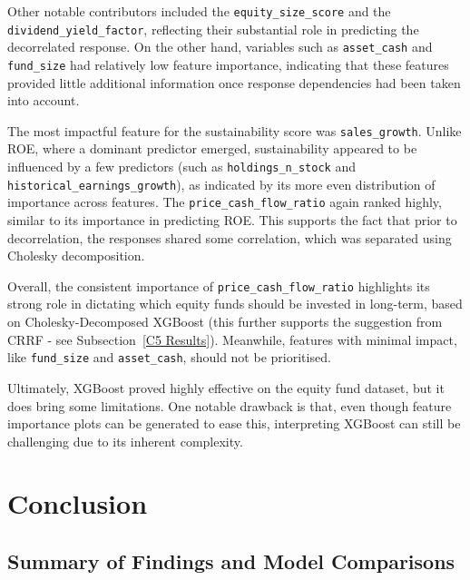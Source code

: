 \documentclass[11pt]{report} %
\begin{document}
Other notable contributors included the \texttt{equity\_size\_score} and the \texttt{dividend\_yield\_factor}, reflecting their substantial role in predicting the decorrelated response. On the other hand, variables such as \texttt{asset\_cash} and \texttt{fund\_size} had relatively low feature importance, indicating that these features provided little additional information once response dependencies had been taken into account.

The most impactful feature for the sustainability score was \texttt{sales\_growth}. Unlike ROE, where a dominant predictor emerged, sustainability appeared to be influenced by a few predictors (such as  \texttt{holdings\_n\_stock} and \texttt{historical\_earnings\_growth}), as indicated by its more even distribution of importance across features. 
The \texttt{price\_cash\_flow\_ratio} again ranked highly, similar to its importance in predicting ROE. This supports the fact that prior to decorrelation, the responses shared some correlation, which was separated using Cholesky decomposition. 

Overall, the consistent importance of \texttt{price\_cash\_flow\_ratio} highlights its strong role in dictating which equity funds should be invested in long-term, based on Cholesky-Decomposed XGBoost (this further supports the suggestion from CRRF - see Subsection~\ref{C5 Results}). Meanwhile, features with minimal impact, like \texttt{fund\_size} and \texttt{asset\_cash}, should not be prioritised. 

Ultimately, XGBoost proved highly effective on the equity fund dataset, but it does bring some limitations. One notable drawback is that, even though feature importance plots can be generated to ease this, interpreting XGBoost can still be challenging due to its inherent complexity.\cite{xgboosting2024}


\chapter{Conclusion}
\section{Summary of Findings and Model Comparisons}
\end{document}
